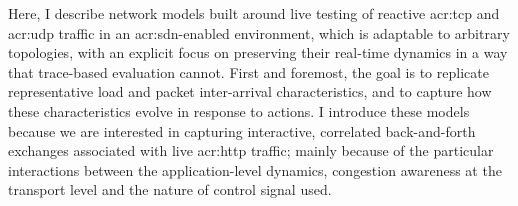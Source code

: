 
%

Here, I describe network models built around live testing of reactive \gls{acr:tcp} and \gls{acr:udp} traffic in an \gls{acr:sdn}-enabled environment, which is adaptable to arbitrary topologies, with an explicit focus on preserving their real-time dynamics in a way that trace-based evaluation cannot.
First and foremost, the goal is to replicate representative load and packet inter-arrival characteristics, and to capture how these characteristics evolve in response to actions.
I introduce these models because we are interested in capturing interactive, correlated back-and-forth exchanges associated with live \gls{acr:http} traffic; mainly because of the particular interactions between the application-level dynamics, congestion awareness at the transport level and the nature of control signal used.




